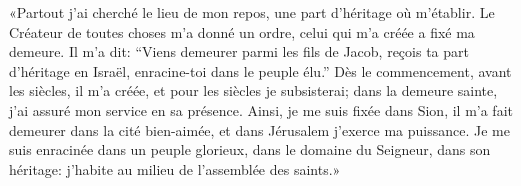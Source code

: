 «Partout j’ai cherché le lieu de mon repos,
	une part d’héritage où m’établir.
Le Créateur de toutes choses m’a donné un ordre,
	celui qui m’a créée a fixé ma demeure.
Il m’a dit: “Viens demeurer parmi les fils de Jacob,
	reçois ta part d’héritage en Israël, enracine-toi dans le peuple élu.”
Dès le commencement, avant les siècles, il m’a créée,
	et pour les siècles je subsisterai;
	dans la demeure sainte, j’ai assuré mon service en sa présence.
Ainsi, je me suis fixée dans Sion,
	il m’a fait demeurer dans la cité bien-aimée,
	et dans Jérusalem j’exerce ma puissance.
Je me suis enracinée dans un peuple glorieux,
	dans le domaine du Seigneur, dans son héritage:
	j’habite au milieu de l’assemblée des saints.»
